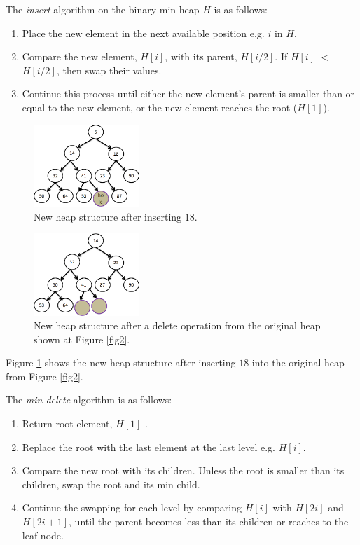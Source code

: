 \documentclass[10pt, conference, compsocconf]{IEEEtran}
\begin{document}
The {\it insert} algorithm on the binary min heap $H$ is as follows:
\begin{enumerate}
\item Place the new element in the next available position e.g. $i$ in $H$.
\item Compare the new element, $H[i]$, with its parent, $H[i/2]$. If $H[i]$ $<$ $H[i/2]$, then swap their values.
\item Continue this process until either the new element's parent is smaller than or equal to the new element, or the new element reaches the root ($H[1]$).
\end{enumerate}

\begin{figure}[!ht]
  \centering
  \includegraphics[width=4cm]{Figures/fig3.png}
      \caption{New heap structure after inserting $18$.}
    \label{fig3}
\end{figure}

\begin{figure}[!ht]
  \centering
  \includegraphics[width=4cm]{Figures/fig4.png}
      \caption{New heap structure after a delete operation from the original heap shown at Figure \ref{fig2}.}
    \label{fig4}
\end{figure}

Figure \ref{fig3} shows the new heap structure after inserting $18$ into the original heap from Figure \ref{fig2}.

The {\it min-delete} algorithm is as follows:
\begin{enumerate}
\item Return root element, $H[1]$ .
\item Replace the root with the last element at the last level e.g. $H[i]$.
\item Compare the new root with its children. Unless the root is smaller than its children, swap the root and its min child.
\item Continue the swapping for each level by comparing $H[i]$ with $H[2i]$ and $H[2i+1]$, until the parent becomes less than its children or reaches to the leaf node.
\end{enumerate}
\end{document}
